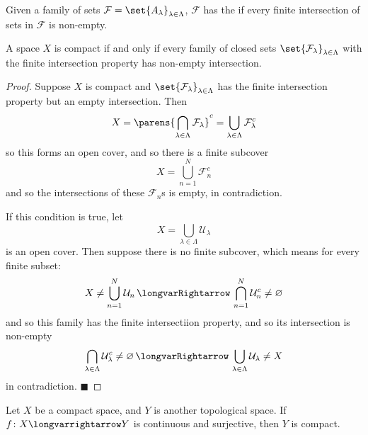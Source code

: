 \documentclass[10pt]{article}
\def\qed{\hskip1cm\penalty-100\hbox{}\hfill$\blacksquare$}
\def\mU{\mathcal{U}}
\def\mF{\mathcal{F}}
\def\longto{\longvarrightarrow}
\def\implies{\,\longvarRightarrow\,}
\begin{document}


\bigskip

\begin{defn*}

    Given a family of sets $\mF=\set{A_\lambda}_{\lambda\in\Lambda}$, $\mF$ has the  if every finite intersection of sets in $\mF$ is non-empty.

\end{defn*}

\begin{prop*}

    A space $X$ is compact if and only if every family of closed sets $\set{\mF_\lambda}_{\lambda\in\Lambda}$ with the finite intersection property has non-empty intersection.

\end{prop*}

\begin{proof}

    Suppose $X$ is compact and $\set{\mF_\lambda}_{\lambda\in\Lambda}$ has the finite intersection property but an empty intersection.
    Then
    \[ X = \parens{\bigcap_{\lambda\in\Lambda}\mF_\lambda}^c = \bigcup_{\lambda\in\Lambda}\mF_\lambda^c \]
    so this forms an open cover, and so there is a finite subcover
    \[ X = \bigcup_{n=1}^N\mF_n^c \]
    and so the intersections of these $\mF_n$s is empty, in contradiction.

    If this condition is true, let
    \[ X = \bigcup_{\lambda\in\Lambda}\mU_\lambda \]
    is an open cover.
    Then suppose there is no finite subcover, which means for every finite subset:
    \[ X \neq \bigcup_{n=1}^N\mU_n \implies \bigcap_{n=1}^N\mU_n^c \neq \varnothing \]
    and so this family has the finite intersectiion property, and so its intersection is non-empty
    \[ \bigcap_{\lambda\in\Lambda}\mU_\lambda^c\neq\varnothing \implies \bigcup_{\lambda\in\Lambda}\mU_\lambda \neq X \]
    in contradiction.
    \qed

\end{proof}

\begin{prop*}

    Let $X$ be a compact space, and $Y$ is another topological space.
    If $f\colon X\longto Y$ is continuous and surjective, then $Y$ is compact.

\end{prop*}
\end{document}
